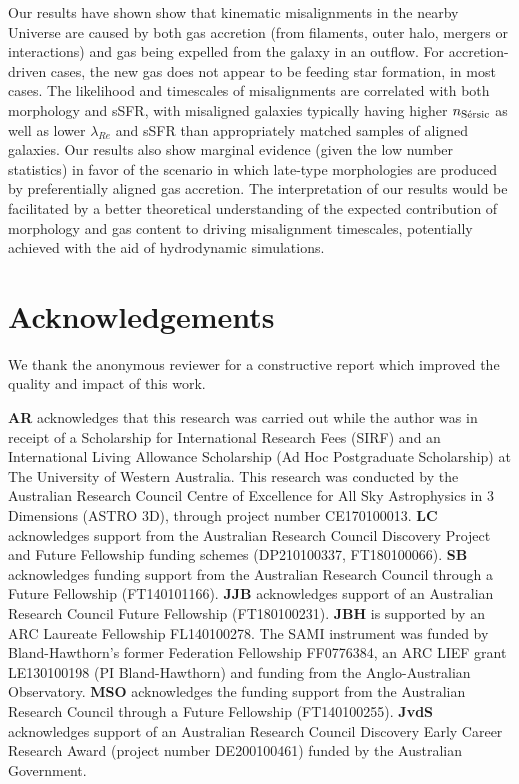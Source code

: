 \documentclass[fleqn,usenatbib]{mnras}
\begin{document}
Our results have shown show that kinematic misalignments in the nearby Universe are caused by both gas accretion (from filaments, outer halo, mergers or interactions) and gas being expelled from the galaxy in an outflow. For accretion-driven cases, the new gas does not appear to be feeding star formation, in most cases.
The likelihood and timescales of misalignments are correlated with both morphology and sSFR, with misaligned galaxies typically having higher $n_{\rm{S\Acute{e}rsic}}$ as well as lower $\lambda_{Re}$ and sSFR than appropriately matched samples of aligned galaxies. Our results also show marginal evidence (given the low number statistics) in favor of the scenario in which late-type morphologies are produced by preferentially aligned gas accretion. 
The interpretation of our results would be facilitated by a better theoretical understanding of the expected contribution of morphology and gas content to driving misalignment timescales, potentially achieved with the aid of hydrodynamic simulations. 

\section*{Acknowledgements}

We thank the anonymous reviewer for a constructive report which improved the quality and impact of this work.

\textbf{AR} acknowledges that this research was carried out while the author was in receipt of a Scholarship for International Research Fees (SIRF) and an International Living Allowance Scholarship (Ad Hoc Postgraduate Scholarship) at The University of Western Australia. This research was conducted by the Australian Research Council Centre of Excellence for All Sky Astrophysics in 3 Dimensions (ASTRO 3D), through project number CE170100013.
\textbf{LC} acknowledges support from the Australian Research Council Discovery Project and Future Fellowship funding schemes (DP210100337, FT180100066). \textbf{SB} acknowledges funding support from the Australian Research Council through a Future Fellowship (FT140101166). \textbf{JJB} acknowledges support of an Australian Research Council Future Fellowship (FT180100231). \textbf{JBH} is supported by an ARC Laureate Fellowship FL140100278. The SAMI instrument was funded by Bland-Hawthorn's former Federation Fellowship FF0776384, an ARC LIEF grant LE130100198 (PI Bland-Hawthorn) and funding from the Anglo-Australian Observatory. \textbf{MSO} acknowledges the funding support from the Australian Research Council through a Future Fellowship (FT140100255). \textbf{JvdS}  acknowledges support of an Australian Research Council Discovery Early Career Research Award (project number DE200100461) funded by the Australian Government.
\end{document}
